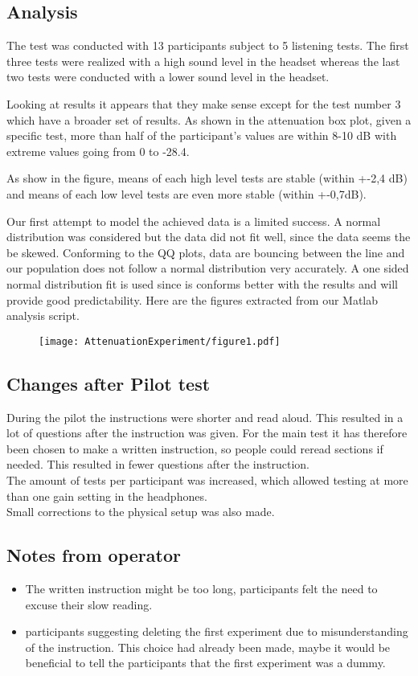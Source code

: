 \subsection{Analysis}

The test was conducted with 13 participants subject to 5 listening tests. The first three tests were realized with a high sound level in the headset whereas the last two tests were conducted with a lower sound level in the headset. 

Looking at results it appears that they make sense except for the test number 3 which have a broader set of results. As shown in the attenuation box plot, given a specific test, more than half of the participant's values are within 8-10 dB with extreme values going from 0 to -28.4.

As show in the figure, means of each high level tests are stable (within +-2,4 dB) and means of each low level tests are even more stable (within +-0,7dB). 

Our first attempt to model the achieved data is a limited success. A normal distribution was considered but the data did not fit well, since the data seems the be skewed. Conforming to the QQ plots, data are bouncing between the line and our population does not follow a normal distribution very accurately. A one sided normal distribution fit is used since is conforms better with the results and will provide good predictability. Here are the figures extracted from our Matlab analysis script.


\begin{figure}[H]
	\texttt{[image: AttenuationExperiment/figure1.pdf]}
\end{figure}

\subsection{Changes after Pilot test}
During the pilot the instructions were shorter and read aloud. This resulted in a lot of questions after the instruction was given. For the main test it has therefore been chosen to make a written instruction, so people could reread sections if needed. This resulted in fewer questions after the instruction. \\
The amount of tests per participant was increased, which allowed testing at more than one gain setting in the headphones. \\
Small corrections to the physical setup was also made. 

\subsection{Notes from operator}
\begin{itemize}
\item The written instruction might be too long, participants felt the need to excuse their slow reading.
\item participants suggesting deleting the first experiment due to misunderstanding of the instruction. This choice had already been made, maybe it would be beneficial to tell the participants that the first experiment was a dummy. 
\end{itemize}

